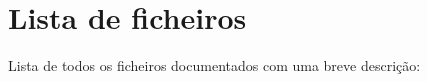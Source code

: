 \section{Lista de ficheiros}
Lista de todos os ficheiros documentados com uma breve descrição\+:\begin{DoxyCompactList}
\item{}
\item{}
\end{DoxyCompactList}
